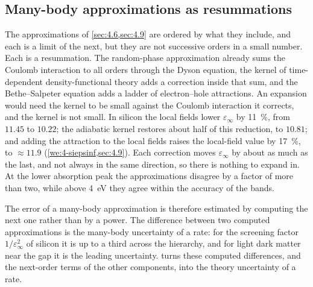 \subsection{Many-body approximations as resummations}

The approximations of \cref{sec:4.6,sec:4.9} are ordered by what they include, and each is a limit of the next, but they are not successive orders in a small number. Each is a resummation. The random-phase approximation already sums the Coulomb interaction to all orders through the Dyson equation, the kernel of time-dependent density-functional theory adds a correction inside that sum, and the Bethe--Salpeter equation adds a ladder of electron--hole attractions. An expansion would need the kernel to be small against the Coulomb interaction it corrects, and the kernel is not small. In silicon the local fields lower $\varepsilon_\infty$ by \SI{11}{\percent}, from $11.45$ to $10.22$; the adiabatic kernel restores about half of this reduction, to $10.81$; and adding the attraction to the local fields raises the local-field value by \SI{17}{\percent}, to $\approx 11.9$ (\cref{we:4-siepsinf,sec:4.9}). Each correction moves $\varepsilon_\infty$ by about as much as the last, and not always in the same direction, so there is nothing to expand in. At the lower absorption peak the approximations disagree by a factor of more than two, while above \SI{4}{eV} they agree within the accuracy of the bands.

The error of a many-body approximation is therefore estimated by computing the next one rather than by a power. The difference between two computed approximations is the many-body uncertainty of a rate: for the screening factor $1/\varepsilon_\infty^2$ of silicon it is up to a third across the hierarchy, and for light dark matter near the gap it is the leading uncertainty.  turns these computed differences, and the next-order terms of the other components, into the theory uncertainty of a rate.

